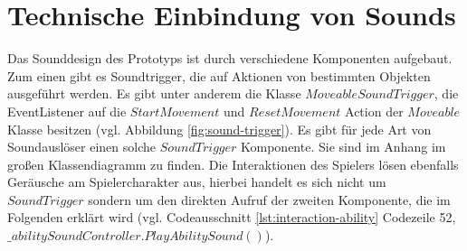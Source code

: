 


\section{Technische Einbindung von Sounds}
Das Sounddesign des Prototyps ist durch verschiedene Komponenten aufgebaut. Zum einen gibt es Soundtrigger, die auf Aktionen von bestimmten Objekten ausgeführt werden. Es gibt unter anderem die Klasse $MoveableSoundTrigger$, die EventListener auf die $StartMovement$ und $ResetMovement$ Action der $Moveable$ Klasse besitzen (vgl. Abbildung \ref{fig:sound-trigger}). Es gibt für jede Art von Soundauslöser einen solche $SoundTrigger$ Komponente. Sie sind im Anhang im großen Klassendiagramm zu finden. Die Interaktionen des Spielers lösen ebenfalls Geräusche am Spielercharakter aus, hierbei handelt es sich nicht um $SoundTrigger$ sondern um den direkten Aufruf der zweiten Komponente, die im Folgenden erklärt wird (vgl. Codeausschnitt \ref{lst:interaction-ability} Codezeile 52, $\_abilitySoundController.PlayAbilitySound()$).

